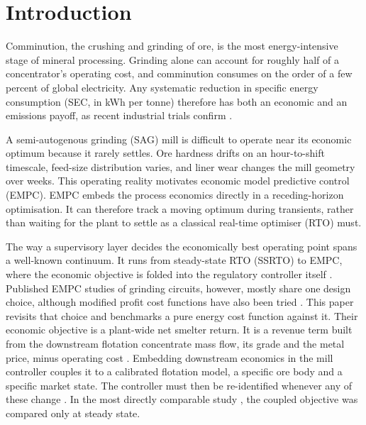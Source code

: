 \documentclass[conference]{IEEEtran}
\begin{document}
\section{Introduction}

Comminution, the crushing and grinding of ore, is the most energy-intensive
stage of mineral processing. Grinding alone can account for roughly half of
a concentrator's operating cost, and comminution consumes on the order of a
few percent of global electricity. Any systematic reduction in specific
energy consumption (SEC, in kWh per tonne) therefore has both an
economic and an emissions payoff, as recent industrial trials
confirm \cite{pinto2025,costa2025}.

A semi-autogenous grinding (SAG) mill is difficult to operate near its
economic optimum because it rarely settles. Ore hardness drifts on an
hour-to-shift timescale, feed-size distribution varies, and liner wear
changes the mill geometry over weeks. This operating reality motivates
economic model predictive control (EMPC). EMPC embeds the process
economics directly in a receding-horizon optimisation. It can therefore
track a moving optimum during transients, rather than waiting for the
plant to settle as a classical real-time optimiser (RTO) must.

The way a supervisory layer decides the economically best operating point
spans a well-known continuum. It runs from steady-state RTO (SSRTO) to
EMPC, where the economic objective is folded into the regulatory
controller itself \cite{matias2022,ellis2017}. Published EMPC studies of
grinding circuits, however, mostly share one design choice, although
modified profit cost functions have also been tried \cite{thivierge2023}.
This paper revisits that choice and benchmarks a pure energy cost
function against it. Their economic objective is a plant-wide net
smelter return. It
is a revenue term built from the downstream flotation concentrate mass
flow, its grade and the metal price, minus operating cost
\cite{leroux2019,thivierge2023}. Embedding downstream economics in the
mill controller couples it to a calibrated flotation model, a specific ore
body and a specific market state. The controller must then be
re-identified whenever any of these change \cite{mittermaier2025}. In the most directly comparable study
\cite{thivierge2023}, the coupled objective was compared only at steady
state.
\end{document}
